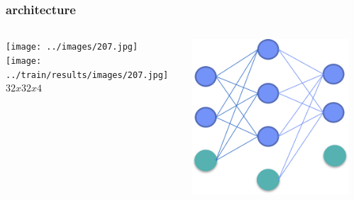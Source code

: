 \documentclass{beamer}
\begin{document}
\begin{frame}
\frametitle{architecture}
\begin{columns}
\begin{column}{.01\textwidth}
\texttt{[image: ../images/207.jpg]}\\
\texttt{[image: ../train/results/images/207.jpg]}\\
$32x32x4$
\end{column}
\begin{column}{.4\textwidth}
\includegraphics[width=\linewidth]{mp1.png}
\end{column}
\begin{column}{.2\textwidth}

\end{column}
\end{columns}
\end{frame}
\end{document}
